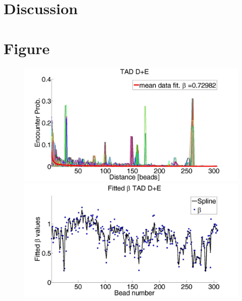 \documentclass[12pt]{paper}
\begin{document}



\section{Discussion}\label{section_discussion}

\section{Figure}\label{section_figures}
\begin{figure}
\includegraphics[scale=0.3]{meanDataFitTADDAndE}
\includegraphics[scale=0.3]{fittedExpValuesWithSplineAverageTADDAndE}
\caption{}\label{figure_encounterProbabilityTADDAndE+fittedBeta}
\end{figure}

\end{document}

